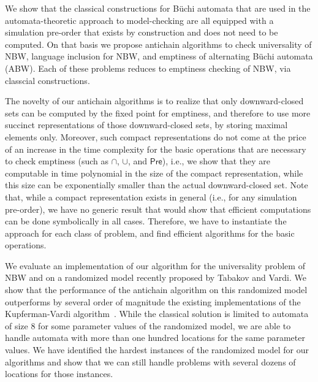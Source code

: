 \documentclass{LMCS}
\newcommand{\Pre}{\mathsf{Pre}}
\begin{document}
We show that the classical constructions for B\"uchi automata that are
used in the automata-theoretic approach to model-checking are all
equipped with a simulation pre-order that exists by construction and
does not need to be computed. On that basis we propose antichain algorithms
to check universality of NBW, language inclusion for NBW, and
emptiness of alternating B\"uchi automata (ABW). Each of these problems
reduces to emptiness checking of NBW, via classcial constructions.

The novelty of our antichain algorithms is to realize that only downward-closed
sets can be computed by the fixed point for emptiness, and therefore to use more 
succinct representations of those downward-closed sets, by storing maximal elements only. 
Moreover, such compact representations do not come at the price of an increase 
in the time complexity for the basic operations that are necessary to check emptiness
(such as $\cap$, $\cup$, and $\Pre$), i.e., we show that they are computable in time
polynomial in the size of the compact representation, while this size can be exponentially
smaller than the actual downward-closed set.
Note that, while a compact representation exists in general (i.e., for any
simulation pre-order), we have no generic result that would show that efficient
computations can be done symbolically in all cases. Therefore, we have to instantiate
the approach for each class of problem, and find efficient algorithms for
the basic operations.






We evaluate an implementation of our algorithm for the
universality problem of NBW and on a randomized model recently
proposed by Tabakov and Vardi.  We show that the performance of the
antichain algorithm on this randomized model outperforms by several order of
magnitude the existing implementations of the Kupferman-Vardi
algorithm~\cite{TabakovV07,GurumurthyKSV03}.  While the classical
solution is limited to automata of size 8 for some parameter values of
the randomized model, we are able to handle automata with more than
one hundred locations for the same parameter values. We have
identified the hardest instances of the randomized model for our
algorithms and show that we can still handle problems with several
dozens of locations for those instances.
\end{document}
